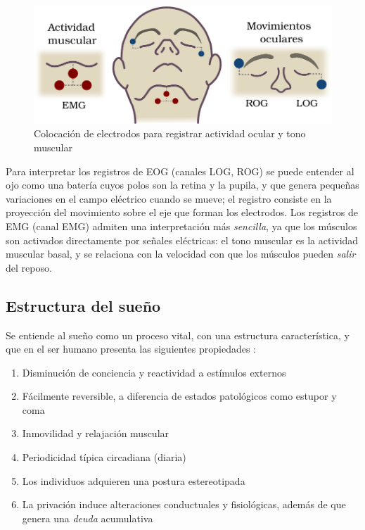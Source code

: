 \begin{figure}
\centering
\includegraphics[width=\linewidth]
{./img_diagramas/emg_eog_v3.pdf}
\caption{Colocación de electrodos para registrar actividad ocular y tono muscular}
\label{emg_eog}
\end{figure}

Para interpretar los registros de EOG (canales LOG, ROG) se puede entender al ojo como una batería
cuyos  polos son la retina y la pupila, y que genera pequeñas variaciones en el campo eléctrico
cuando se mueve; el registro consiste en la proyección del movimiento sobre el eje que forman los
electrodos.
%
Los registros de EMG (canal EMG) admiten una interpretación más \textit{sencilla}, ya que los
músculos son activados directamente por señales eléctricas: el tono muscular es la actividad 
muscular basal, y se relaciona con la velocidad con que los músculos pueden \textit{salir} del 
reposo.


\subsection{Estructura del sueño}

Se entiende al sueño como un proceso vital, con una estructura característica, y que en el ser 
humano presenta las siguientes propiedades \cite{CarrilloMora}:
\begin{enumerate}
\item Disminución de conciencia y reactividad a estímulos externos
\item Fácilmente reversible, a diferencia de estados patológicos como estupor y coma
\item Inmovilidad y relajación muscular
\item Periodicidad típica circadiana (diaria)
\item Los individuos adquieren una postura estereotipada
\item La privación induce alteraciones conductuales y 
fisiológicas, además de que genera una \textit{deuda} acumulativa
\end{enumerate}

